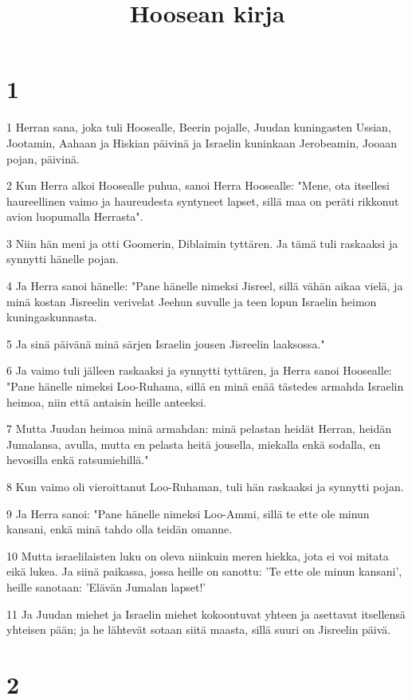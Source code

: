 

\title{Hoosean kirja}


\chapter{1}

\par 1 Herran sana, joka tuli Hoosealle, Beerin pojalle, Juudan kuningasten Ussian, Jootamin, Aahaan ja Hiskian päivinä ja Israelin kuninkaan Jerobeamin, Jooaan pojan, päivinä.
\par 2 Kun Herra alkoi Hoosealle puhua, sanoi Herra Hoosealle: "Mene, ota itsellesi haureellinen vaimo ja haureudesta syntyneet lapset, sillä maa on peräti rikkonut avion luopumalla Herrasta".
\par 3 Niin hän meni ja otti Goomerin, Diblaimin tyttären. Ja tämä tuli raskaaksi ja synnytti hänelle pojan.
\par 4 Ja Herra sanoi hänelle: "Pane hänelle nimeksi Jisreel, sillä vähän aikaa vielä, ja minä kostan Jisreelin verivelat Jeehun suvulle ja teen lopun Israelin heimon kuningaskunnasta.
\par 5 Ja sinä päivänä minä särjen Israelin jousen Jisreelin laaksossa."
\par 6 Ja vaimo tuli jälleen raskaaksi ja synnytti tyttären, ja Herra sanoi Hoosealle: "Pane hänelle nimeksi Loo-Ruhama, sillä en minä enää tästedes armahda Israelin heimoa, niin että antaisin heille anteeksi.
\par 7 Mutta Juudan heimoa minä armahdan: minä pelastan heidät Herran, heidän Jumalansa, avulla, mutta en pelasta heitä jousella, miekalla enkä sodalla, en hevosilla enkä ratsumiehillä."
\par 8 Kun vaimo oli vieroittanut Loo-Ruhaman, tuli hän raskaaksi ja synnytti pojan.
\par 9 Ja Herra sanoi: "Pane hänelle nimeksi Loo-Ammi, sillä te ette ole minun kansani, enkä minä tahdo olla teidän omanne.
\par 10 Mutta israelilaisten luku on oleva niinkuin meren hiekka, jota ei voi mitata eikä lukea. Ja siinä paikassa, jossa heille on sanottu: 'Te ette ole minun kansani', heille sanotaan: 'Elävän Jumalan lapset!'
\par 11 Ja Juudan miehet ja Israelin miehet kokoontuvat yhteen ja asettavat itsellensä yhteisen pään; ja he lähtevät sotaan siitä maasta, sillä suuri on Jisreelin päivä.

\chapter{2}

